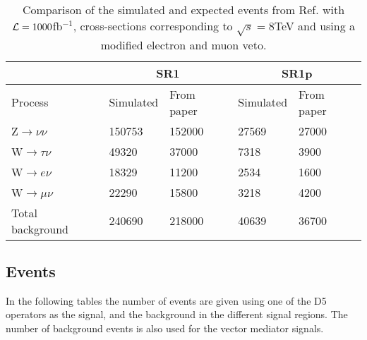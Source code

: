 \begin{table}[ht]
\begin{center}
\begin{tabular}{|l|l|l|l|l|}
\hline
& \multicolumn{2}{c}{SR1} & \multicolumn{2}{|c|}{SR1p} \\
\hline
Process & Simulated  & From paper & Simulated & From paper  \\ \hline
Z$\rightarrow\nu\nu$ & 150753 & 152000 & 27569 & 27000 \\
W$\rightarrow\tau\nu$ & 49320 & 37000 & 7318 & 3900 \\
W$\rightarrow e\nu$ & 18329 & 11200 & 2534 & 1600 \\
W$\rightarrow\mu\nu$ & 22290 & 15800 & 3218 & 4200 \\ \hline
Total background & 240690 & 218000 & 40639 & 36700 \\ \hline
\end{tabular}
\caption{Comparison of the simulated and expected events from Ref. \citep{ATLAS-CONF-2012-147} with $\mathcal{L}=1000$fb$^{-1}$, cross-sections corresponding to $\sqrt{s}=8$TeV and using a modified electron and muon veto.}

\label{tab:newcomp}
\end{center}
\end{table}


\subsection{Events}
In the following tables the number of events are given using one of the D5 operators as the signal, and the background in the different signal regions. The number of background events is also used for the vector mediator signals.

